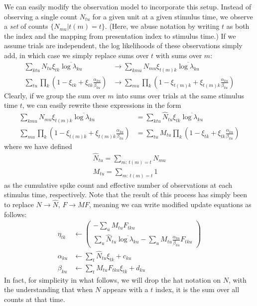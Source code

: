 \documentclass[11pt]{article}
\begin{document}
We can easily modify the observation model to incorporate this setup. Instead of observing a single count $N_{tu}$ for a given unit at a given stimulus time, we observe a \emph{set} of counts $\{ N_{m u} \vert t(m) = t \}$. (Here, we abuse notation by writing $t$ as both the index and the mapping from presentation index to stimulus time.) If we assume trials are independent, the log likelihoods of these observations simply add, in which case we simply replace sums over $t$ with sums over $m$:
\begin{align}
    \sum_{ktu} N_{tu} \xi_{tk} \overline{\log \lambda_{ku}} &\rightarrow \sum_{km u} N_{m u} \xi_{t(m) k} \overline{\log \lambda_{ku}} \\
    \sum_{tu} \prod_k \left( 1 - \xi_{tk} + \xi_{tk} \frac{\alpha_{ku}}{\beta_{ku}}\right) &\rightarrow \sum_{m u} \prod_k \left( 1 - \xi_{t(m) k} + \xi_{t(m) k} \frac{\alpha_{ku}}{\beta_{ku}}\right)
\end{align}
Clearly, if we group the sum over $m$ into sums over trials at the same stimulus time $t$, we can easily rewrite these expressions in the form
\begin{align}
    \sum_{km u} N_{m u} \xi_{t(m) k} \overline{\log \lambda_{ku}} &= \sum_{ktu} \hat{N}_{tu} \xi_{tk} \overline{\log \lambda_{ku}} \\
    \sum_{m u} \prod_k \left( 1 - \xi_{t(m) k} + \xi_{t(m) k} \frac{\alpha_{ku}}{\beta_{ku}}\right) &= \sum_{tu} M_{tu}\prod_k \left( 1 - \xi_{tk} + \xi_{tk} \frac{\alpha_{ku}}{\beta_{ku}}\right)
\end{align}
where we have defined
\begin{align}
    \hat{N}_{tu} = \sum_{m:\, t(m) = t} N_{m u} \\
    M_{tu} = \sum_{m:\, t(m) = t} 1
\end{align}
as the cumulative spike count and effective number of observations at each stimulus time, respectively. Note that the result of this process has simply been to replace $N \rightarrow \hat{N}$, $F \rightarrow M F$, meaning we can write modified update equations as follows:
\begin{align}
    \eta_{tk} &\leftarrow
    \begin{pmatrix}
        -\sum_u M_{tu} F_{tku} \\
        \sum_u \hat{N}_{tu} \overline{\log \lambda_{ku}} -
        \sum_u M_{tu}\frac{\alpha_{ku}}{\beta_{ku}} F_{tku}
    \end{pmatrix} \\
    \alpha_{ku} &\leftarrow \sum_t \hat{N}_{tu} \xi_{tk} + c_{ku} \\
    \beta_{ku} &\leftarrow \sum_t M_{tu} F_{tku}\xi_{tk} + d_{ku}
\end{align}
In fact, for simplicity in what follows, we will drop the hat notation on $N$, with the understanding that when $N$ appears with a $t$ index, it is the sum over all counts at that time.
\end{document}
